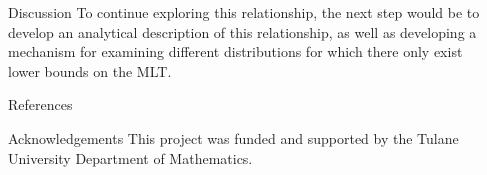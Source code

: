 \documentclass[final]{beamer}
\newlength{\sepwidth}
\newlength{\colwidth}
\newcommand{\separatorcolumn}{\begin{column}{\sepwidth}\end{column}}
\begin{document}
\begin{frame}[t]
\begin{columns}[t]
\begin{column}{\colwidth}
\begin{block}{Discussion}
    To continue exploring this relationship, the next step would be to develop an analytical description of this relationship, as well as developing a mechanism for examining different distributions for which there only exist lower bounds on the MLT. 

  \end{block}

  


  \begin{block}{References}

    \nocite{*}
    \footnotesize{}

  \end{block}

  \begin{block}{Acknowledgements}
    This project was funded and supported by the Tulane University Department of Mathematics.
  
  \end{block}

\end{column}

\separatorcolumn
\end{columns}
\end{frame}
\end{document}
